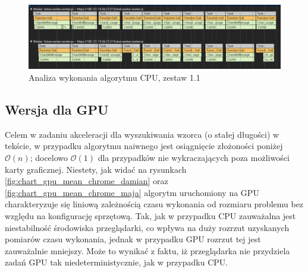 \begin{figure}
    \centering
    \includegraphics[keepaspectratio, width=1.0\linewidth]{benchmarks/nvidia970_chrome/cpu_2_profiler.png}
    \caption{Analiza wykonania algorytmu CPU, zestaw 1.1}
    \label{fig:profiler_cpu}
\end{figure}


\subsection{Wersja dla GPU}



Celem w zadaniu akceleracji dla wyszukiwania wzorca (o stałej długości) w tekście, w przypadku algorytmu naiwnego jest osiągnięcie złożoności poniżej $\mathcal{O}(n)$; docelowo $\mathcal{O}(1)$ dla przypadków nie wykraczających poza możliwości karty graficznej. Niestety, jak widać na rysunkach \ref{fig:chart_gpu_mean_chrome_damian} oraz \ref{fig:chart_gpu_mean_chrome_maja} algorytm uruchomiony na GPU charakteryzuje się liniową zależnością czasu wykonania od rozmiaru problemu bez względu na konfigurację sprzętową. Tak, jak w przypadku CPU zauważalna jest niestabilność środowiska przeglądarki, co wpływa na duży rozrzut uzyskanych pomiarów czasu wykonania, jednak w przypadku GPU rozrzut tej jest zauważalnie mniejszy. Może to wynikać z faktu, iż przeglądarka nie przydziela zadań GPU tak niedeterministycznie, jak w przypadku CPU.

